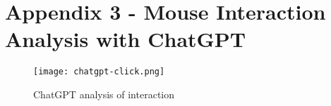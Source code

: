 \chapter*{Appendix 3 - Mouse Interaction Analysis with ChatGPT}
\label{chap:chatgpt-mouse}

\begin{figure}[h]
    \centering
    \texttt{[image: chatgpt-click.png]}
    \caption[ChatGPT analysis of interaction]{ChatGPT analysis of interaction}
    \label{fig:chatgpt-click}
\end{figure}

\clearpage